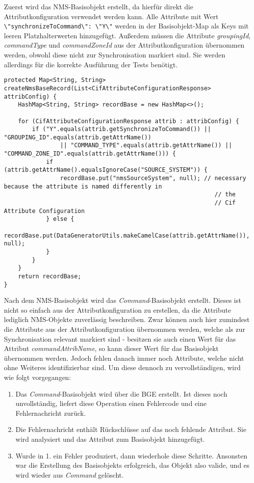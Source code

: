 Zuerst wird das \ac{NMS}-Basisobjekt erstellt, da hierfür direkt die Attributkonfiguration verwendet werden kann. Alle Attribute mit Wert \colorbox{background}{\lstinline{\"synchronizeToCommand\": \"Y\"}} werden in der Basisobjekt-Map als Keys mit leeren Platzhalterwerten hinzugefügt. Außerdem müssen die Attribute \textit{groupingId}, \textit{commandType} und \textit{commandZoneId} aus der Attributkonfiguration übernommen werden, obwohl diese nicht zur Synchronisation markiert sind. Sie werden allerdings für die korrekte Ausführung der Tests benötigt.

\begin{lstlisting}[caption=Methode zum Erstellen eines \ac{NMS}-Basisobjekts, label=nmsBaseRecord,style=Javastyle]
protected Map<String, String> createNmsBaseRecord(List<CifAttributeConfigurationResponse> attribConfig) {
	HashMap<String, String> recordBase = new HashMap<>();

	for (CifAttributeConfigurationResponse attrib : attribConfig) {
		if ("Y".equals(attrib.getSynchronizeToCommand()) || "GROUPING_ID".equals(attrib.getAttrName())
				|| "COMMAND_TYPE".equals(attrib.getAttrName()) || "COMMAND_ZONE_ID".equals(attrib.getAttrName())) {
			if (attrib.getAttrName().equalsIgnoreCase("SOURCE_SYSTEM")) {
				recordBase.put("nmsSourceSystem", null); // necessary because the attribute is named differently in
															// the
															// Cif Attribute Configuration
			} else {
				recordBase.put(DataGeneratorUtils.makeCamelCase(attrib.getAttrName()), null);
			}
		}
	}
	return recordBase;
}
\end{lstlisting}

Nach dem \ac{NMS}-Basisobjekt wird das \textit{Command}-Basisobjekt erstellt. Dieses ist nicht so einfach aus der Attributkonfiguration zu erstellen, da die Attribute lediglich \ac{NMS}-Objekte zuverlässig beschreiben. Zwar können auch hier zumindest die Attribute aus der Attributkonfiguration übernommen werden, welche als zur Synchronisation relevant markiert sind - besitzen sie auch einen Wert für das Attribut \textit{commandAttribName}, so kann dieser Wert für das Basisobjekt übernommen werden. Jedoch fehlen danach immer noch Attribute, welche nicht ohne Weiteres identifizierbar sind. Um diese dennoch zu vervollständigen, wird wie folgt vorgegangen:

\begin{enumerate}
    \item Das \textit{Command}-Basisobjekt wird über die \ac{BGE} erstellt. Ist dieses noch unvollständig, liefert diese Operation einen Fehlercode und eine Fehlernachricht zurück.
    \item Die Fehlernachricht enthält Rückschlüsse auf das noch fehlende Attribut. Sie wird analysiert und das Attribut zum Basisobjekt hinzugefügt.
    \item Wurde in 1. ein Fehler produziert, dann wiederhole diese Schritte. Ansonsten war die Erstellung des Basisobjekts erfolgreich, das Objekt also valide, und es wird wieder aus \textit{Command} gelöscht.
\end{enumerate}

